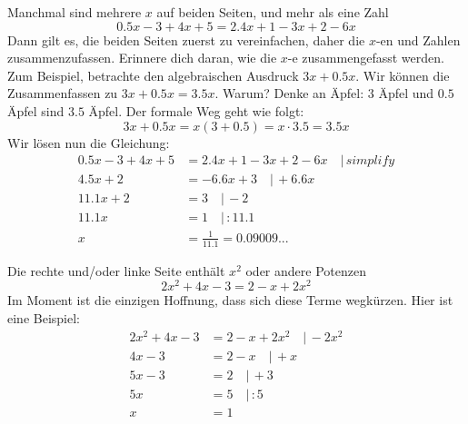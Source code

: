 \documentclass[%
11pt,%
twoside,%
titlepage,%
german,%
headsepline%
]{scrartcl}
\begin{document}
\begin{bsp}
                Manchmal sind mehrere $x$ auf beiden Seiten, und mehr als eine Zahl $$0.5 x-3 +4x +5 = 2.4 x+1 -3x+2-6x$$ Dann gilt es, die beiden Seiten zuerst zu vereinfachen, daher die $x$-en und Zahlen zusammenzufassen. Erinnere dich daran, wie die $x$-e zusammengefasst werden. Zum Beispiel, betrachte den algebraischen Ausdruck $3x+0.5x$. Wir können die Zusammenfassen zu $3x+0.5x=3.5x$. Warum? Denke an Äpfel: $3$ Äpfel und $0.5$ Äpfel sind $3.5$ Äpfel. Der formale Weg geht wie folgt: $$3x+0.5x=x(3+0.5)=x\cdot 3.5=3.5x$$ Wir lösen nun die Gleichung:
                \begin{align*}
                0.5 x-3 +4x +5& = 2.4 x+1 -3x+2-6x\quad| \, simplify\\
                4.5 x +2 & = -6.6x +3 \quad| \, +6.6x\\
                11.1 x +2 & = 3 \quad| \, -2\\
                11.1 x & =1 \quad| \, :11.1\\
                x & = \frac{1}{11.1}={0.09009...}
                \end{align*}
\end{bsp}           

\begin{bsp} Die rechte und/oder linke Seite enthält $x^2$ oder andere Potenzen $$2x^2+4x-3 =  2-x+2x^2$$ Im Moment ist die einzigen Hoffnung, dass sich diese Terme wegkürzen. Hier ist eine Beispiel:
                \begin{align*}
                2x^2+4x-3 &=  2-x+2x^2 \quad| \, -2x^2\\
                4x -3 & = 2-x \quad| \, +x\\
                5x -3 & = 2 \quad| \, +3\\
                5x & = 5 \quad| \, :5\\
                x & ={1}\\
                \end{align*}
\end{bsp}           
\end{document}
